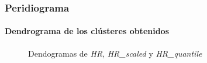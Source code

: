 \subsubsection{Peridiograma}

\paragraph{Dendrograma de los clústeres obtenidos}

\begin{figure}[H]
    \centering
    
    \caption{Dendogramas de \textit{HR}, \textit{HR\_scaled} y \textit{HR\_quantile}}
    \label{fig:per_den_fc}
\end{figure}

